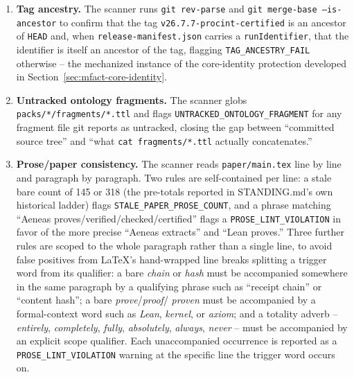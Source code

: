 \begin{enumerate}
  flags \texttt{STALE\_PROOF\_BINDING} if its \texttt{aeneasDecl} field is
  the literal string \texttt{"TBD"}, or if its status is
  \texttt{PROVEN} but the corresponding Lean proof file under
  \texttt{dist/verif/lean/.../Corr/} is missing, or its comment-stripped
  body does not reference the declared \texttt{aeneasModule}. This check
  is developed further, alongside the correspondence rail proper, in
  Chapter~\ref{ch:correspondence}.
\item \textbf{Tag ancestry.} The scanner runs \texttt{git rev-parse} and
  \texttt{git merge-base --is-ancestor} to confirm that the tag
  \texttt{v26.7.7-procint-certified} is an ancestor of \texttt{HEAD} and,
  when \texttt{release-manifest.json} carries a \texttt{runIdentifier},
  that the identifier is itself an ancestor of the tag, flagging
  \texttt{TAG\_ANCESTRY\_FAIL} otherwise -- the mechanized instance of the
  core-identity protection developed in
  Section~\ref{sec:mfact-core-identity}.
\item \textbf{Untracked ontology fragments.} The scanner globs
  \texttt{packs/*/fragments/*.ttl} and flags
  \texttt{UNTRACKED\_ONTOLOGY\_FRAGMENT} for any fragment file git
  reports as untracked, closing the gap between ``committed source
  tree'' and ``what \texttt{cat fragments/*.ttl} actually concatenates.''
\item \textbf{Prose/paper consistency.} The scanner reads
  \texttt{paper/main.tex} line by line and paragraph by paragraph. Two
  rules are self-contained per line: a stale bare count of 145 or 318
  (the pre-\TotalDecls totals reported in STANDING.md's own historical
  ladder) flags \texttt{STALE\_PAPER\_PROSE\_COUNT}, and a phrase
  matching ``Aeneas proves/verified/checked/certified'' flags a
  \texttt{PROSE\_LINT\_VIOLATION} in favor of the more precise ``Aeneas
  extracts'' and ``Lean proves.'' Three further rules are scoped to the
  whole paragraph rather than a single line, to avoid false positives
  from LaTeX's hand-wrapped line breaks splitting a trigger word from its
  qualifier: a bare \emph{chain} or \emph{hash} must be accompanied
  somewhere in the same paragraph by a qualifying phrase such as
  ``receipt chain'' or ``content hash''; a bare \emph{prove}/\emph{proof}/
  \emph{proven} must be accompanied by a formal-context word such as
  \emph{Lean}, \emph{kernel}, or \emph{axiom}; and a totality adverb --
  \emph{entirely}, \emph{completely}, \emph{fully}, \emph{absolutely},
  \emph{always}, \emph{never} -- must be accompanied by an explicit scope
  qualifier. Each unaccompanied occurrence is reported as a
  \texttt{PROSE\_LINT\_VIOLATION} warning at the specific line the
  trigger word occurs on.
\end{enumerate}

